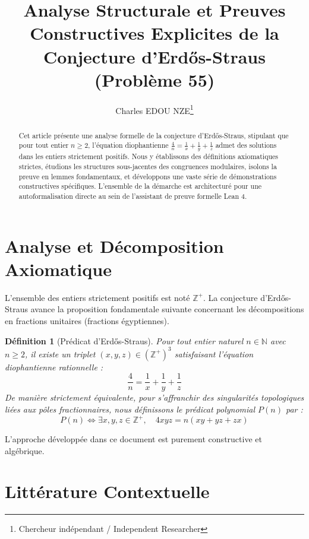 \documentclass[11pt,a4paper]{article}
\title{Analyse Structurale et Preuves Constructives Explicites de la Conjecture d'Erd\H{o}s-Straus (Problème 55)}
\author{Charles EDOU NZE\thanks{Chercheur indépendant / Independent Researcher}}
\date{}
\newtheorem{definition}[theorem]{Définition}
\begin{document}
\maketitle

\begin{abstract}
Cet article présente une analyse formelle de la conjecture d'Erd\H{o}s-Straus, stipulant que pour tout entier $n \ge 2$, l'équation diophantienne $\frac{4}{n} = \frac{1}{x} + \frac{1}{y} + \frac{1}{z}$ admet des solutions dans les entiers strictement positifs. Nous y établissons des définitions axiomatiques strictes, étudions les structures sous-jacentes des congruences modulaires, isolons la preuve en lemmes fondamentaux, et développons une vaste série de démonstrations constructives spécifiques. L'ensemble de la démarche est architecturé pour une autoformalisation directe au sein de l'assistant de preuve formelle Lean 4.
\end{abstract}

\tableofcontents
\newpage

\section{Analyse et Décomposition Axiomatique}

L'ensemble des entiers strictement positifs est noté $\mathbb{Z}^{+}$. La conjecture d'Erd\H{o}s-Straus avance la proposition fondamentale suivante concernant les décompositions en fractions unitaires (fractions égyptiennes).

\begin{definition}[Prédicat d'Erd\H{o}s-Straus]
Pour tout entier naturel $n \in \mathbb{N}$ avec $n \ge 2$, il existe un triplet $(x, y, z) \in (\mathbb{Z}^{+})^3$ satisfaisant l'équation diophantienne rationnelle :
\begin{equation}
\frac{4}{n} = \frac{1}{x} + \frac{1}{y} + \frac{1}{z}
\label{eq:erdos}
\end{equation}
De manière strictement équivalente, pour s'affranchir des singularités topologiques liées aux pôles fractionnaires, nous définissons le prédicat polynomial $P(n)$ par :
$$ P(n) \iff \exists x, y, z \in \mathbb{Z}^{+}, \quad 4xyz = n(xy + yz + zx) $$
\end{definition}

L'approche développée dans ce document est purement constructive et algébrique.

\section{Littérature Contextuelle}
\end{document}
